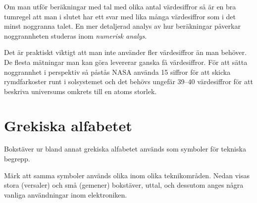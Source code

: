 Om man utför beräkningar med tal med olika antal värdesiffror så är en
bra tumregel att man i slutet har ett svar med lika många värdesiffror som i det
minst noggranna talet.
En mer detaljerad analys av hur beräkningar påverkar noggrannheten studeras inom
\emph{numerisk analys}.

Det är praktiskt viktigt att man inte använder fler värdesiffror än
man behöver.
De flesta mätningar man kan göra levererar ganska få värdesiffror.
För att sätta noggrannhet i perspektiv så påstås NASA använda 15 siffror för att
skicka rymdfarkoster runt i solsystemet och det behövs ungefär 39--40
värdesiffror för att beskriva universums omkrets till en atoms storlek.




\newpage
\section{Grekiska alfabetet}

Bokstäver ur bland annat grekiska alfabetet används som symboler för
tekniska begrepp.

Märk att samma symboler används olika inom olika teknikområden.
Nedan visas stora (versaler) och små (gemener) bokstäver, uttal, och dessutom
anges några vanliga användningar inom elektroniken.

